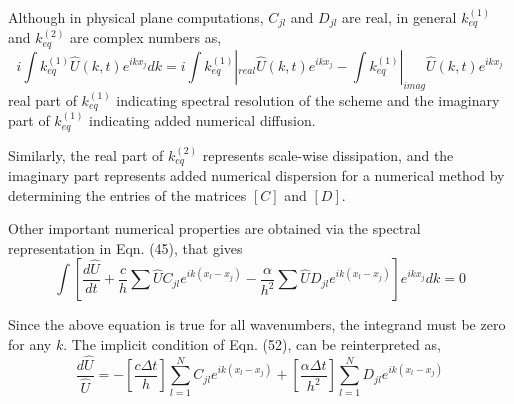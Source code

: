 \documentclass[showpacs,preprintnumbers,amsmath,amssymb]{revtex4-1} %
\begin{document}
Although in physical plane computations, $C_{jl}$ and $D_{jl}$ are real, in general $k_{eq}^{(1)}$ and $k_{eq}^{(2)}$ are complex numbers as, 
\begin{equation}
i\int k_{eq}^{(1)}\hat{U}(k,t)e^{ikx_j}dk= i\int k_{eq}^{(1)}|_{real}\hat{U}(k,t)e^{ikx_j}-\int k_{eq}^{(1)}|_{imag}\hat{U}(k,t)e^{ikx_j}
\end{equation}
real part of $k_{eq}^{(1)}$ indicating spectral resolution of the scheme and the imaginary part of $k_{eq}^{(1)}$ indicating added numerical diffusion.

Similarly, the real part of $k_{eq}^{(2)}$ represents scale-wise dissipation, and the imaginary part represents added numerical dispersion for a numerical method by determining the entries of the matrices $[C]$ and $[D]$.

Other important numerical properties are obtained via the spectral representation in Eqn. (45), that gives
\begin{equation}
\int \left[ \frac{d \hat{U}}{d t} + \frac{c}{h}\sum \hat{U}C_{jl}e^{ik(x_l-x_j)} - \frac{\alpha}{h^2}\sum \hat{U}D_{jl}e^{ik(x_l-x_j)} \right]e^{ikx_j}dk=0
\end{equation}

Since the above equation is true for all wavenumbers, the integrand must be zero for any $k$. The implicit condition of Eqn. (52), can be reinterpreted as,
\begin{equation}
\frac{d\hat{U}}{\hat{U}}=-\left[\frac{c\Delta t}{h}\right] \sum_{l=1}^N C_{jl}e^{ik(x_l-x_j)} + \left[\frac{\alpha \Delta t}{h^2}\right] \sum_{l=1}^N D_{jl}e^{ik(x_l-x_j)}
\end{equation}
\end{document}
